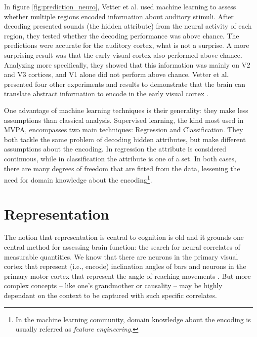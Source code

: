         In figure \ref{fig:prediction_neuro}, Vetter et al. \cite{vetter2014decoding} used machine learning to assess whether multiple regions encoded information about auditory stimuli. After decoding presented sounds (the hidden attribute) from the neural activity of each region, they tested whether the decoding performance was above chance. The predictions were accurate for the auditory cortex, what is not a surprise. A more surprising result was that the early visual cortex also performed above chance. Analyzing more specifically, they showed that this information was mainly on V2 and V3 cortices, and V1 alone did not perform above chance. Vetter et al. presented four other experiments and results to demonstrate that the brain can translate abstract information to encode in the early visual cortex \cite{vetter2014decoding}.
        
        One advantage of machine learning techniques is their generality: they make less assumptions than classical analysis. Supervised learning, the kind most used in MVPA, encompasses two main techniques: Regression and Classification. They both tackle the same problem of decoding hidden attributes, but make different assumptions about the encoding. In regression the attribute is considered continuous, while in classification the attribute is one of a set. In both cases, there are many degrees of freedom that are fitted from the data, lessening the need for domain knowledge about the encoding\footnote{In the machine learning community, domain knowledge about the encoding is usually referred as \textit{feature engineering}.}.


\section{Representation}
\label{sec:representation}
    The notion that representation is central to cognition is old \cite[p.~134-140]{rosch1991embodied} and it grounds one central method for assessing brain function: the search for neural correlates of measurable quantities. We know that there are neurons in the primary visual cortex that represent (i.e., encode) inclination angles of bars \cite[p.~13]{dayan2001theoretical} and neurons in the primary motor cortex that represent the angle of reaching movements \cite[p.~14]{dayan2001theoretical}. But more complex concepts -- like one's grandmother \cite{gross2002genealogy} or causality \cite{blakemore2001brain} -- may be highly dependant on the context to be captured with such specific correlates.
    
